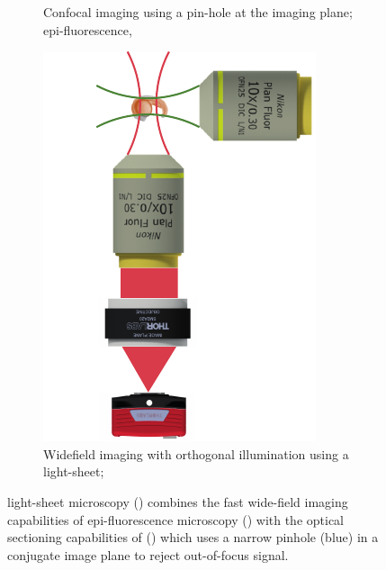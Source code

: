 \begin{figure}
\begin{subfigure}[t]{0.3\textwidth}
        \caption{Confocal imaging using a pin-hole at the imaging plane; epi-fluorescence, }\label{fig:epi_con_lsfm/confocal}
    \end{subfigure}
        \hfill%
    \begin{subfigure}[t]{0.34\textwidth}
        \centering
        \includegraphics{epi_con_lsfm/spim}
        \caption{Widefield imaging with orthogonal illumination using a \gls{light-sheet}; }\label{fig:epi_con_lsfm/spim}
    \end{subfigure}
    \caption[Comparison of \gls{wide-field}, \gls{confocal} and \gls{light-sheet} microscopy imaging modalities]
    {\Gls{light-sheet} microscopy () combines the fast \gls{wide-field} imaging capabilities of epi-fluorescence microscopy () with the optical sectioning capabilities of  () which uses a narrow pinhole (blue) in a conjugate image plane to reject out-of-focus signal.
    }\label{fig:epi_con_lsfm}
\end{figure}



